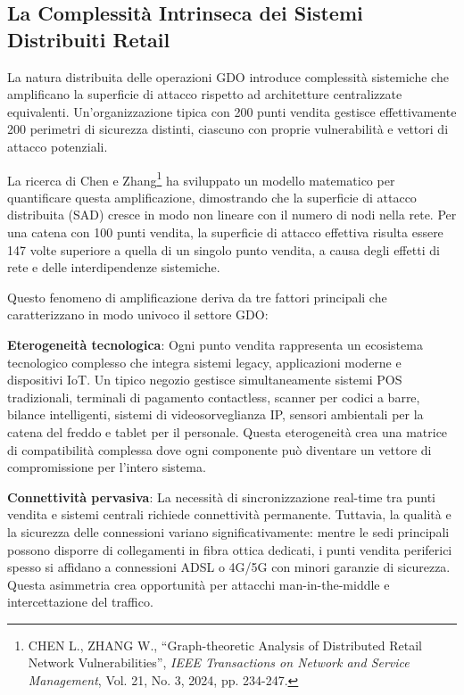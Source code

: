 \subsection{La Complessità Intrinseca dei Sistemi Distribuiti Retail}

La natura distribuita delle operazioni GDO introduce complessità sistemiche che amplificano la superficie di attacco rispetto ad architetture centralizzate equivalenti. Un'organizzazione tipica con 200 punti vendita gestisce effettivamente 200 perimetri di sicurezza distinti, ciascuno con proprie vulnerabilità e vettori di attacco potenziali.

La ricerca di Chen e Zhang\footnote{CHEN L., ZHANG W., ``Graph-theoretic Analysis of Distributed Retail Network Vulnerabilities'', \textit{IEEE Transactions on Network and Service Management}, Vol. 21, No. 3, 2024, pp. 234-247.} ha sviluppato un modello matematico per quantificare questa amplificazione, dimostrando che la superficie di attacco distribuita (SAD) cresce in modo non lineare con il numero di nodi nella rete. Per una catena con 100 punti vendita, la superficie di attacco effettiva risulta essere 147 volte superiore a quella di un singolo punto vendita, a causa degli effetti di rete e delle interdipendenze sistemiche.

Questo fenomeno di amplificazione deriva da tre fattori principali che caratterizzano in modo univoco il settore GDO:

\textbf{Eterogeneità tecnologica}: Ogni punto vendita rappresenta un ecosistema tecnologico complesso che integra sistemi legacy, applicazioni moderne e dispositivi IoT. Un tipico negozio gestisce simultaneamente sistemi POS tradizionali, terminali di pagamento contactless, scanner per codici a barre, bilance intelligenti, sistemi di videosorveglianza IP, sensori ambientali per la catena del freddo e tablet per il personale. Questa eterogeneità crea una matrice di compatibilità complessa dove ogni componente può diventare un vettore di compromissione per l'intero sistema.

\textbf{Connettività pervasiva}: La necessità di sincronizzazione real-time tra punti vendita e sistemi centrali richiede connettività permanente. Tuttavia, la qualità e la sicurezza delle connessioni variano significativamente: mentre le sedi principali possono disporre di collegamenti in fibra ottica dedicati, i punti vendita periferici spesso si affidano a connessioni ADSL o 4G/5G con minori garanzie di sicurezza. Questa asimmetria crea opportunità per attacchi man-in-the-middle e intercettazione del traffico.

